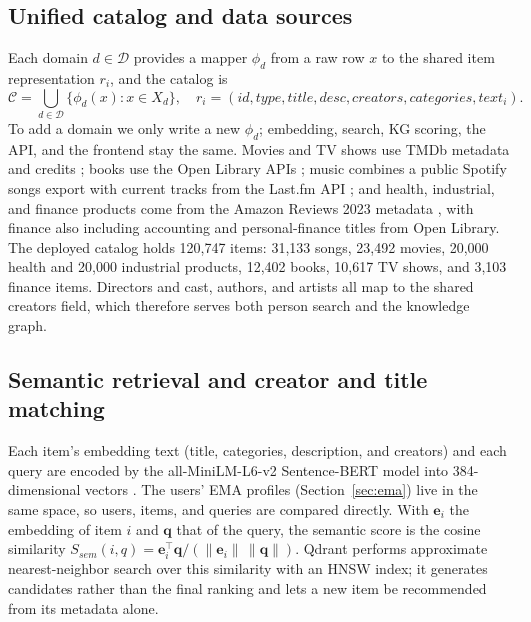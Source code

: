 \documentclass[3p,times,procedia]{elsarticle}
\begin{document}
\subsection{Unified catalog and data sources}
\label{sec:catalog}
Each domain $d\in\mathcal{D}$ provides a mapper $\phi_d$ from a raw row $x$ to the shared item representation $r_i$, and the catalog is
\begin{equation}
    \mathcal{C}=\bigcup_{d\in\mathcal{D}}\{\phi_d(x):x\in X_d\},
    \quad
    r_i=(id,type,title,desc,creators,categories,text_i).
    \label{eq:catalog_union}
\end{equation}
To add a domain we only write a new $\phi_d$; embedding, search, KG scoring, the API, and the frontend stay the same. Movies and TV shows use TMDb metadata and credits \cite{tmdb}; books use the Open Library APIs \cite{openlibrary}; music combines a public Spotify songs export with current tracks from the Last.fm API \cite{lastfm}; and health, industrial, and finance products come from the Amazon Reviews 2023 metadata \cite{hou2024blair}, with finance also including accounting and personal-finance titles from Open Library. The deployed catalog holds 120,747 items: 31,133 songs, 23,492 movies, 20,000 health and 20,000 industrial products, 12,402 books, 10,617 TV shows, and 3,103 finance items. Directors and cast, authors, and artists all map to the shared creators field, which therefore serves both person search and the knowledge graph.

\subsection{Semantic retrieval and creator and title matching}
\label{sec:person}
Each item's embedding text (title, categories, description, and creators) and each query are encoded by the all-MiniLM-L6-v2 Sentence-BERT model into 384-dimensional vectors \cite{reimers2019sbert}. The users' EMA profiles (Section~\ref{sec:ema}) live in the same space, so users, items, and queries are compared directly. With $\mathbf{e}_i$ the embedding of item $i$ and $\mathbf{q}$ that of the query, the semantic score is the cosine similarity $S_{\mathit{sem}}(i,q)=\mathbf{e}_i^\top\mathbf{q}/(\|\mathbf{e}_i\|\,\|\mathbf{q}\|)$. Qdrant performs approximate nearest-neighbor search over this similarity with an HNSW index; it generates candidates rather than the final ranking and lets a new item be recommended from its metadata alone.
\end{document}
